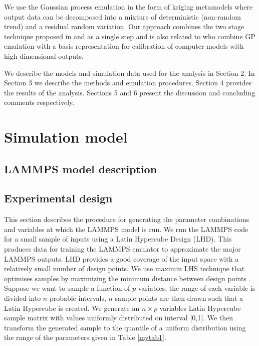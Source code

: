 We use the Gaussian process emulation in the form of kriging metamodels where output data can be decomposed into a mixture of deterministic (non-random trend) and a residual random variation. Our approach combines the two stage technique proposed in \citet{pd11} and \citet{qwole} as a single step and is also related to \citet{l6} who combine GP emulation with a basis representation for calibration of computer models with high dimensional outputs.

We describe the models and simulation data used for the analysis in Section 2. In Section 3 we describe the methods and emulation procedures. Section 4 provides the results of the analysis. Sections 5 and 6 present the discussion and concluding comments respectively.

\section{Simulation model}
\subsection{LAMMPS model description}

\subsection{Experimental design}
This section describes the procedure for generating the parameter combinations and variables at which the LAMMPS model is run. We run the LAMMPS code for a small sample of inputs using a Latin Hypercube Design (LHD). This produces data for training the LAMMPS emulator to approximate the major LAMMPS outputs. LHD provides a good coverage of the input space with a relatively small number of design points. We use maximin LHS technique that optimises samples by maximizing the minimum distance between design points \citet{pd5}. Suppose we want to sample a function of $p$ variables, the range of each variable is divided into $n$ probable intervals, $n$ sample points are then drawn such that a Latin Hypercube is created.
We generate an $n \times p$ variables Latin Hypercube sample matrix with values uniformly distributed on interval [0,1]. We then transform the generated sample to the quantile of a uniform distribution using the range of the parameters given in Table \ref{mytab1}. %

